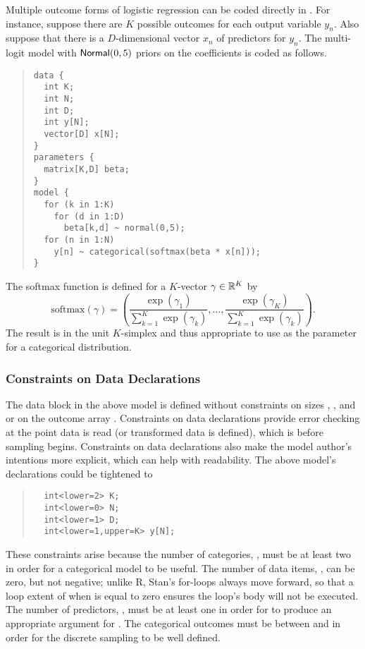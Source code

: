 Multiple outcome forms of logistic regression can be coded directly in
\Stan.  For instance, suppose there are $K$ possible outcomes for each
output variable $y_n$.  Also suppose that there is a $D$-dimensional
vector $x_n$ of predictors for $y_n$.  The multi-logit model with
$\mbox{\sf Normal}(0,5)$ priors on the coefficients is coded as follows.
%
\begin{quote}
\begin{Verbatim}[fontsize=\small]
data {
  int K;
  int N;
  int D;
  int y[N];
  vector[D] x[N];
}
parameters {
  matrix[K,D] beta;
}
model {
  for (k in 1:K)
    for (d in 1:D)
      beta[k,d] ~ normal(0,5);
  for (n in 1:N)
    y[n] ~ categorical(softmax(beta * x[n]));
}
\end{Verbatim}
\end{quote}
%

The softmax function is defined for a $K$-vector $\gamma \in \mathbb{R}^K$ by
\[
\mbox{softmax}(\gamma) = 
\left(
 \frac{\exp(\gamma_1)}
      {\sum_{k=1}^K \exp(\gamma_k)},
  \ldots,
  \frac{\exp(\gamma_K)}
       {\sum_{k=1}^K \exp(\gamma_k)}
\right).
\]
%
The result is in the unit $K$-simplex and thus appropriate to use as
the parameter for a categorical distribution.

\subsubsection{Constraints on Data Declarations}

The data block in the above model is defined without constraints on
sizes , , and  or on the outcome array
.  Constraints on data declarations provide error checking at
the point data is read (or transformed data is defined), which is
before sampling begins.  Constraints on data declarations also make
the model author's intentions more explicit, which can help with
readability.  The above model's declarations could be tightened to
%
\begin{quote}
\begin{Verbatim}
  int<lower=2> K;
  int<lower=0> N;
  int<lower=1> D;
  int<lower=1,upper=K> y[N];
\end{Verbatim}
\end{quote}
%
These constraints arise because the number of categories, ,
must be at least two in order for a categorical model to be useful.
The number of data items, , can be zero, but not negative;
unlike R, Stan's for-loops always move forward, so that a loop extent
of  when  is equal to zero ensures the loop's body
will not be executed.  The number of predictors, , must be at
least one in order for  to produce an
appropriate argument for .  The categorical outcomes
 must be between  and  in order for the
discrete sampling to be well defined.

